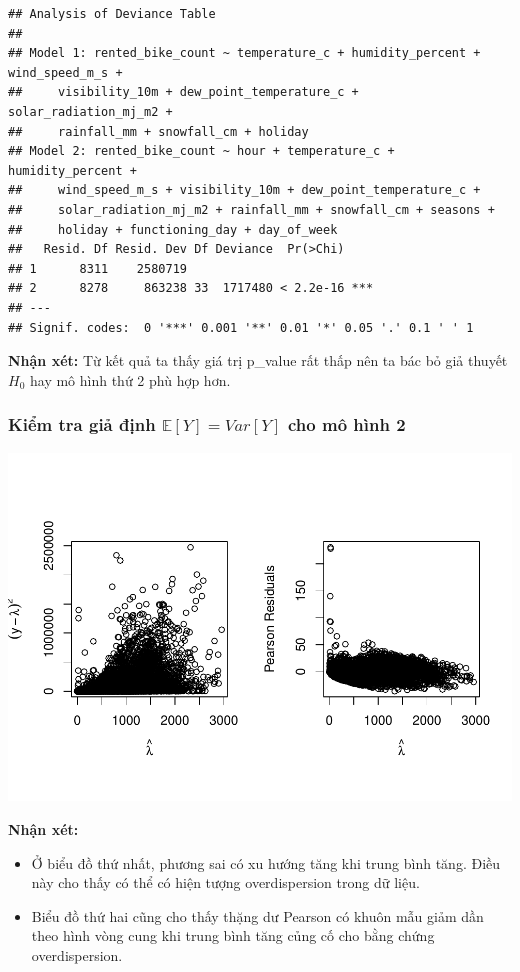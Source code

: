 \documentclass[
  11pt,
  letterpaper,
]{article}
\begin{document}
\begin{verbatim}
## Analysis of Deviance Table
## 
## Model 1: rented_bike_count ~ temperature_c + humidity_percent + wind_speed_m_s + 
##     visibility_10m + dew_point_temperature_c + solar_radiation_mj_m2 + 
##     rainfall_mm + snowfall_cm + holiday
## Model 2: rented_bike_count ~ hour + temperature_c + humidity_percent + 
##     wind_speed_m_s + visibility_10m + dew_point_temperature_c + 
##     solar_radiation_mj_m2 + rainfall_mm + snowfall_cm + seasons + 
##     holiday + functioning_day + day_of_week
##   Resid. Df Resid. Dev Df Deviance  Pr(>Chi)    
## 1      8311    2580719                          
## 2      8278     863238 33  1717480 < 2.2e-16 ***
## ---
## Signif. codes:  0 '***' 0.001 '**' 0.01 '*' 0.05 '.' 0.1 ' ' 1
\end{verbatim}

\textbf{Nhận xét:} Từ kết quả ta thấy giá trị p\_value rất thấp nên ta bác bỏ giả thuyết \(H_0\) hay mô hình thứ 2 phù hợp hơn.

\subsubsection{Kiểm tra giả định $\mathbb{E}[Y] = Var[Y]$ cho mô hình 2}

\begin{center}\includegraphics[width=1.2\linewidth,]{Final_Project_files/figure-latex/unnamed-chunk-26-1} \end{center}

\textbf{Nhận xét:}

\begin{itemize}
\item Ở biểu đồ thứ nhất, phương sai có xu hướng tăng khi trung bình tăng. Điều này cho thấy có thể có hiện tượng overdispersion trong dữ liệu.
\item Biểu đồ thứ hai cũng cho thấy thặng dư Pearson có khuôn mẫu giảm dần theo hình vòng cung khi trung bình tăng củng cố cho bằng chứng overdispersion.
\end{itemize}
\end{document}
